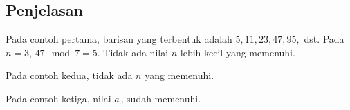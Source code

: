 \documentclass{article}
\begin{document}
\subsection*{Penjelasan}

\par\noindent Pada contoh pertama, barisan yang terbentuk adalah $5, 11, 23, 47, 95,$ dst. Pada $n = 3$, $47 \mod 7 = 5$. Tidak ada nilai $n$ lebih kecil yang memenuhi.

\par\noindent Pada contoh kedua, tidak ada $n$ yang memenuhi.

\par\noindent Pada contoh ketiga, nilai $a_0$ sudah memenuhi.
\end{document}
